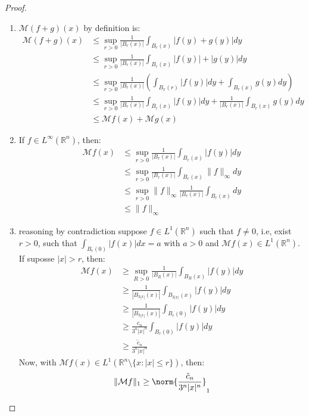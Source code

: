 \begin{proof} 
  \begin{enumerate}
    \item $\mathcal{M}(f+g)(x)$ by definition is:
      \begin{align*}
        \mathcal{M}(f+g)(x)&\leq\sup_{r>0}\frac{1}{|B_r(x)|}\int_{B_r(x)}|f(y)+g(y)|dy\\
        &\leq \sup_{r>0}\frac{1}{|B_r(x)|}\int_{B_r(x)}|f(y)|+|g(y)|dy\\
        &\leq \sup_{r>0}\frac{1}{|B_r(x)|}\left( \int_{B_x(r)}|f(y)|dy+\int_{B_r(x)}g(y)dy\right)\\
        &\leq \sup_{r>0}\frac{1}{|B_r(x)|}\int_{B_r(x)}|f(y)|dy + \frac{1}{|B_r(x)|}\int_{B_r(x)}g(y)dy\\
        &\leq \mathcal{M}f(x)+\mathcal{M}g(x)
      \end{align*}
    \item If $f\in L^{\infty}(\mathbb{R}^{n})$, then:
      \begin{align*}
        \mathcal{M}f(x)&\leq \sup_{r>0}\frac{1}{|B_r(x)|}\int_{B_r(x)}|f(y)|dy\\
        &\leq \sup_{r>0} \frac{1}{|B_r(x)|}\int_{B_r(x)}\|f\|_{\infty}dy\\
        &\leq \sup_{r>0} \|f\|_{\infty}\frac{1}{|B_r(x)|}\int_{B_r(x)}dy\\
        &\leq \|f\|_{\infty}
      \end{align*}
    \item reasoning by contradiction suppose $f\in L^1(\mathbb{R}^{n})$ such that $f\neq 0$, i.e, exist $r>0$, such that $\int_{B_r(0)}|f(x)|dx=a$ with $a>0$ and $\mathcal{M}f(x)\in L^1(\mathbb{R}^{n})$.\\
      If suposse $|x|>r$, then:
      \begin{align*}
        \mathcal{M}f(x)&\geq \sup_{R>0}\frac{1}{|B_R(x)|}\int_{B_{R}(x)}|f(y)|dy\\
        &\geq \frac{1}{|B_{3|x|}(x)|}\int_{B_{3|x|}(x)}|f(y)|dy\\
        &\geq \frac{1}{|B_{3|x|}(x)|}\int_{B_r(0)}|f(y)|dy\\
        &\geq \frac{c_{n}}{3^{n}|x|^{n}}\int_{B_r(0)}|f(y)|dy\\
        &\geq \frac{\tilde{c}_{n}}{3^{n}|x|^{n}}
      \end{align*}
      Now, with $\mathcal{M}f(x)\in L^1(\mathbb{R}^{n}\setminus\{x:|x|\leq r\})$, then:
      \begin{align*}
        \|\mathcal{M}f\|_{1}&\geq\norm{\frac{\tilde{c}_{n}}{3^{n}|x|^{n}}}_{1}\\

\end{align*}
\end{enumerate}
\end{proof}
